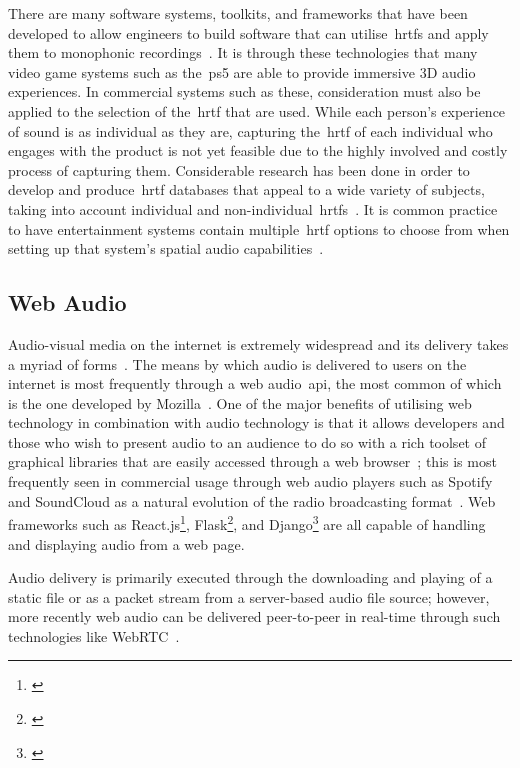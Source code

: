 There are many software systems, toolkits, and frameworks that have been developed to allow engineers to build software that can utilise~\glspl{hrtf} and apply them to monophonic recordings~\citep{3d_tune_in, resonance}.
It is through these technologies that many video game systems such as the~\gls{ps5} are able to provide immersive 3D audio experiences.
In commercial systems such as these, consideration must also be applied to the selection of the~\gls{hrtf} that are used.
While each person's experience of sound is as individual as they are, capturing the~\gls{hrtf} of each individual who engages with the product is not yet feasible due to the highly involved and costly process of capturing them.
Considerable research has been done in order to develop and produce~\gls{hrtf} databases that appeal to a wide variety of subjects, taking into account individual and non-individual~\glspl{hrtf}~\citep{armstrong_}.
It is common practice to have entertainment systems contain multiple~\gls{hrtf} options to choose from when setting up that system's spatial audio capabilities~\citep{shukla2018user}.

\subsection{Web Audio}\label{subsec:web-audio}

Audio-visual media on the internet is extremely widespread and its delivery takes a myriad of forms~\citep{Bruegger2018}.
The means by which audio is delivered to users on the internet is most frequently through a web audio~\gls{api}, the most common of which is the one developed by Mozilla~\citep{w3c_audio_api, mdn_audio_api}.
One of the major benefits of utilising web technology in combination with audio technology is that it allows developers and those who wish to present audio to an audience to do so with a rich toolset of graphical libraries that are easily accessed through a web browser~\citep{Pauwels2018pywebaudioplayerBT};
this is most frequently seen in commercial usage through web audio players such as Spotify and SoundCloud as a natural evolution of the radio broadcasting format~\citep{Bottomley2020}.
Web frameworks such as React.js\footnote{\citep{Minnick2022}}, Flask\footnote{\citep{Zhai2022}}, and Django\footnote{\citep{Pauwels2018pywebaudioplayerBT}} are all capable of handling and displaying audio from a web page.

Audio delivery is primarily executed through the downloading and playing of a static file or as a packet stream from a server-based audio file source;
however, more recently web audio can be delivered peer-to-peer in real-time through such technologies like WebRTC~\citep{webrtc, Garcia2019}.

